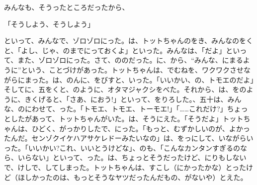 みんなも、そうったところだったから、

「そうしよう、そうしよう」

といって、みんなで、ゾロゾロにった。は、トットちゃんのをき、みんなのをくと、「よし、じゃ、のまでにっておくよ」といった。みんなは、「だよ」といって、また、ゾロゾロにった。さて、ののだった。に、から、“みんな、にまるように”という、ことづけがあった。トットちゃんは、でむねを、ワクワクさせながらにまった。は、のんに、をびすと、いった。「いいかい、の、トモエのだよ」そしてに、五をくと、のように、オタマジャクシをべた。それから、は、をのように、きくげると、「さあ、におう!」といって、をりろした。、五十は、みんな、のにわせて、った。「トモエ、トモエ、トーモエ!」「……これだけ?」ちょっとしたがあって、トットちゃんがいた。は、そうにえた。「そうだよ」トットちゃんは、ひどく、がっかりしたで、にった。「もっと、むずかしいのが、よかったんだ。センゾクイケハアサケレドーみたいなの」は、をっにして、いながらいった。「いいかい?これ、いいとうけどな」、のも、「こんなカンタンすぎるのなら、いらない」といって、った。は、ちょっとそうだったけど、にりもしないで、けしで、してしまった。トットちゃんは、すこし（にかったかな）とったけど（ほしかったのは、もっとそうなヤツだったんだもの、がないや）とえた。

